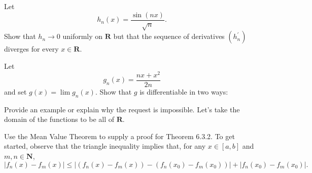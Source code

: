\begin{exercise}
  Let
  $$
  h_{n}(x)=\frac{\sin (n x)}{\sqrt{n}} .
  $$
  Show that $h_{n} \rightarrow 0$ uniformly on $\mathbf{R}$ but that the sequence of derivatives $\left(h_{n}^{\prime}\right)$ diverges for every $x \in \mathbf{R}$.
\end{exercise}
\begin{solution}
  \TODO
\end{solution}
\begin{exercise}
  Let
  $$
  g_{n}(x)=\frac{n x+x^{2}}{2 n}
  $$
  and set $g(x)=\lim g_{n}(x)$. Show that $g$ is differentiable in two ways:
\end{exercise}
\begin{solution}
  \TODO
\end{solution}
\begin{exercise}
  Provide an example or explain why the request is impossible. Let's take the domain of the functions to be all of $\mathbf{R}$.
\end{exercise}
\begin{solution}
  \TODO
\end{solution}
\begin{exercise}
  Use the Mean Value Theorem to supply a proof for Theorem 6.3.2. To get started, observe that the triangle inequality implies that, for any $x \in[a, b]$ and $m, n \in \mathbf{N}$,
  $$
  \left|f_{n}(x)-f_{m}(x)\right| \leq\left|\left(f_{n}(x)-f_{m}(x)\right)-\left(f_{n}\left(x_{0}\right)-f_{m}\left(x_{0}\right)\right)\right|+\left|f_{n}\left(x_{0}\right)-f_{m}\left(x_{0}\right)\right| .
  $$
\end{exercise}
\begin{solution}
  \TODO
\end{solution}

